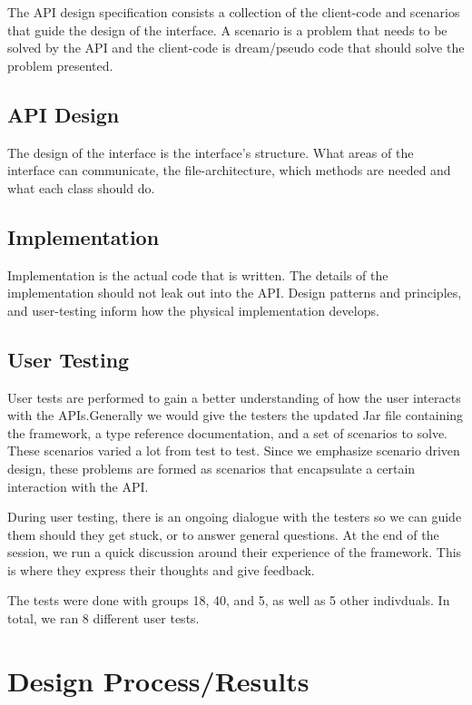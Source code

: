 \documentclass[12pt]{article}
\begin{document}
    The API design specification consists a collection of the client-code and scenarios that guide the design of the interface. A scenario is a problem that needs to be solved by the API and the client-code is dream/pseudo code that should solve the problem presented.

    \subsection{API Design}

    The design of the interface is the interface’s structure. What areas of the interface can communicate, the file-architecture, which methods are needed and what each class should do. 

    \subsection{Implementation}

    Implementation is the actual code that is written. The details of the implementation should not leak out into the API. Design patterns and principles, and user-testing inform how the physical implementation develops.

    \subsection{User Testing}

    User tests are performed to gain a better understanding of how the user interacts with the APIs.Generally we would give the testers the updated Jar file containing the framework, a type reference documentation, and a set of scenarios to solve. These scenarios varied a lot from test to test. Since we emphasize scenario driven design, these problems are formed as scenarios that encapsulate a certain interaction with the API.  

    During user testing, there is an ongoing dialogue with the testers so we can guide them should they get stuck, or to answer general questions. At the end of the session, we run a quick discussion around their experience of the framework. This is where they express their thoughts and give feedback.

    The tests were done with groups 18, 40, and 5, as well as 5 other indivduals. In total, we ran 8 different user tests.


\section{Design Process/Results}
\end{document}
